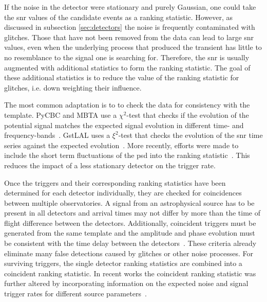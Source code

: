 If the noise in the detector were stationary and purely Gaussian, one could take the \acrshort{snr} values of the candidate events as a ranking statistic. However, as discussed in subsection \ref{sec:detectors} the noise is frequently contaminated with glitches. Those that have not been removed from the data can lead to large \acrshort{snr} values, even when the underlying process that produced the transient has little to no resemblance to the signal one is searching for. Therefore, the \acrshort{snr} is usually augmented with additional statistics to form the ranking statistic. The goal of these additional statistics is to reduce the value of the ranking statistic for glitches, i.e. down weighting their influence.

The most common adaptation is to to check the data for consistency with the template. PyCBC and MBTA use a $\chi^2$-test that checks if the evolution of the potential signal matches the expected signal evolution in different time- and frequency-bands~\cite{Allen:2004gu, Usman:2015kfa, Adams:2015ulm}. GstLAL uses a $\xi^2$-test that checks the evolution of the \acrshort{snr} time series against the expected evolution~\cite{Messick:2016aqy}. More recently, efforts were made to include the short term fluctuations of the \acrshort{psd} into the ranking statistic~\cite{Venumadhav:2019tad, Nitz:2020oeq}. This reduces the impact of a less stationary detector on the trigger rate.

Once the triggers and their corresponding ranking statistics have been determined for each detector individually, they are checked for coincidences between multiple observatories. A signal from an astrophysical source has to be present in all detectors and arrival times may not differ by more than the time of flight difference between the detectors. Additionally, coincident triggers must be generated from the same template and the amplitude and phase evolution must be consistent with the time delay between the detectors~\cite{Nitz:2017svb}. These criteria already eliminate many false detections caused by glitches or other noise processes. For surviving triggers, the single detector ranking statistics are combined into a coincident ranking statistic. In recent works the coincident ranking statistic was further altered by incorporating information on the expected noise and signal trigger rates for different source parameters~\cite{Nitz:2017svb}.

